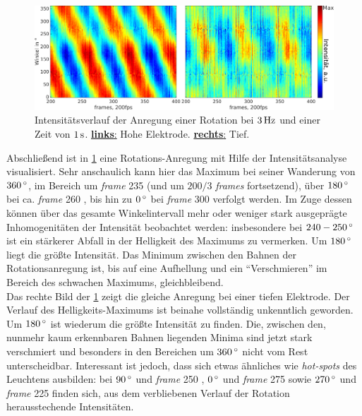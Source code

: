 \documentclass[numbers=noenddot,a4paper,notitlepage,twoside,BCOR15mm]{scrbook}
\newcommand{\degree}{^\circ}
\newcommand{\tilt}[1]{\textit{#1}}
\newcommand{\fett}[1]{\textbf{#1}}
\begin{document}
				\begin{figure}[!t]
					\centering
					\includegraphics[width=\textwidth]{figs/auswertung/plasmaglw/randrotathochutief3Hz1sekwink.png}
					\caption{Intensitätsverlauf der Anregung einer Rotation bei $\unit[3]{Hz}$ und einer Zeit von $\unit[1]{s}$. \underline{\fett{links}:} Hohe Elektrode. \underline{\fett{rechts}:} Tief.}
					\label{img:randhochutiefrotat}
					\vspace{-0.5cm}
				\end{figure}

			Abschließend ist in \ref{img:randhochutiefrotat} eine Rotations-Anregung mit Hilfe der Intensitätsanalyse visualisiert. Sehr anschaulich kann hier das Maximum bei seiner Wanderung von $\unit[360]{\degree}$, im Bereich um \tilt{frame} 235 (und um $200/3$ \tilt{frames} fortsetzend), über $\unit[180]{\degree}$ bei ca. \tilt{frame} 260 , bis hin zu $\unit[0]{\degree}$ bei \tilt{frame} 300 verfolgt werden. Im Zuge dessen können über das gesamte Winkelintervall mehr oder weniger stark ausgeprägte Inhomogenitäten der Intensität beobachtet werden: insbesondere bei $\unit[240-250]{\degree}$ ist ein stärkerer Abfall in der Helligkeit des Maximums zu vermerken. Um $\unit[180]{\degree}$ liegt die größte Intensität. Das Minimum zwischen den Bahnen der Rotationsanregung ist, bis auf eine Aufhellung und ein "`Verschmieren"' im Bereich des schwachen Maximums, gleichbleibend.\\
			Das rechte Bild der \ref{img:randhochutiefrotat} zeigt die gleiche Anregung bei einer tiefen Elektrode. Der Verlauf des Helligkeits-Maximums ist beinahe vollständig unkenntlich geworden. Um $\unit[180]{\degree}$ ist wiederum die größte Intensität zu finden. Die, zwischen den, nunmehr kaum erkennbaren Bahnen liegenden Minima sind jetzt stark verschmiert und besonders in den Bereichen um $\unit[360]{\degree}$ nicht vom Rest unterscheidbar. Interessant ist jedoch, dass sich etwas ähnliches wie \tilt{hot-spots} des Leuchtens ausbilden: bei $\unit[90]{\degree}$ und \tilt{frame} 250 , $\unit[0]{\degree}$ und  \tilt{frame} 275 sowie $\unit[270]{\degree}$ und \tilt{frame} 225 finden sich, aus dem verbliebenen Verlauf der Rotation herausstechende Intensitäten. 
\end{document}

